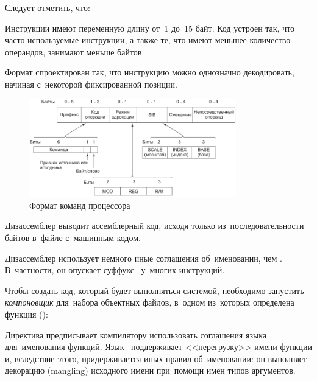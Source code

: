 
Следует отметить, что:
\begin{itemfeature}
  \item Инструкции  имеют переменную длину от~1 до~15 байт. Код устроен так, что часто используемые инструкции, а также те, что имеют меньшее количество операндов, занимают меньше байтов.

  \item Формат спроектирован так, что инструкцию можно однозначно декодировать, начиная с~некоторой фиксированной позиции.

  \begin{figure}[h]
    {\centering
      \includegraphics[width=0.8\textwidth]{images/command_format_corei7.png}

    }
    \caption{Формат команд процессора \,}
    \label{fig:cmd:corei7}
  \end{figure}

  \item Дизассемблер выводит ассемблерный код, исходя только из~последовательности байтов в~файле с~машинным кодом.

  \item Дизассемблер использует немного иные соглашения об~именовании, чем \GCC. В~частности, он опускает суффукс~ у~многих инструкций.
\end{itemfeature}

Чтобы создать код, который будет выполняться системой, необходимо запустить \emph{компоновщик} для~набора объектных файлов, в~одном из~которых определена функция  ():


Директива  предписывает компилятору использовать соглашения языка~ для~именования функций. Язык~ поддерживает <<перегрузку>> имени функции и, вследствие этого, придерживается иных правил об~именовании: он выполняет декорацию (\textenglish{mangling}) исходного имени при~помощи имён типов аргументов.

